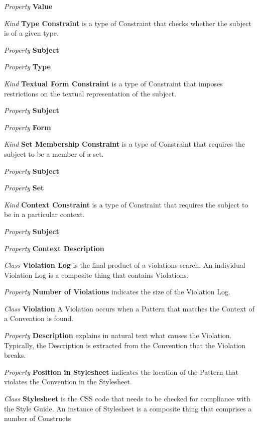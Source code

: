 \documentclass[parskip=full]{uvamscse}
\begin{document}
\begin{description}
\textit{Property} \textbf{Value}


\item\textit{Kind} \textbf{Type Constraint} is a type of Constraint that checks whether the subject is of a given type.

\textit{Property} \textbf{Subject} 

\textit{Property} \textbf{Type}


\item\textit{Kind} \textbf{Textual Form Constraint} is a type of Constraint that imposes restrictions on the textual representation of the subject.

\textit{Property} \textbf{Subject} 

\textit{Property} \textbf{Form}


\item\textit{Kind} \textbf{Set Membership Constraint} is a type of Constraint that requires the subject to be a member of a set.

\textit{Property} \textbf{Subject} 

\textit{Property} \textbf{Set}


\item\textit{Kind} \textbf{Context Constraint} is a type of Constraint that requires the subject to be in a particular context.

\textit{Property} \textbf{Subject} 

\textit{Property} \textbf{Context Description}


\item\textit{Class} \textbf{Violation Log} is the final product of a violations search. An individual Violation Log is a composite thing that contains Violations.

\textit{Property} \textbf{Number of Violations} indicates the size of the Violation Log. 


\item\textit{Class} \textbf{Violation} A Violation occurs when a Pattern that matches the Context of a Convention is found.

\textit{Property} \textbf{Description} explains in natural text what causes the Violation. Typically, the Description is extracted from the Convention that the Violation breaks.

\textit{Property} \textbf{Position in Stylesheet} indicates the location of the Pattern that violates the Convention in the Stylesheet. 


\item\textit{Class} \textbf{Stylesheet} is the CSS code that needs to be checked for compliance with the Style Guide. An instance of Stylesheet is a composite thing that comprises a number of Constructs



\end{description}
\end{document}
